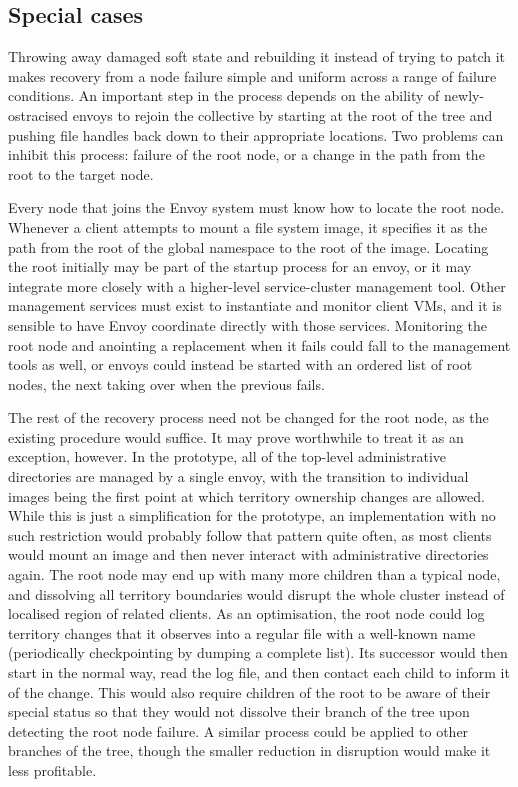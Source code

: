 \subsection{Special cases}

Throwing away damaged soft state and rebuilding it instead of trying to patch it makes recovery from a node failure simple and uniform across a range of failure conditions. An important step in the process depends on the ability of newly-ostracised envoys to rejoin the collective by starting at the root of the tree and pushing file handles back down to their appropriate locations. Two problems can inhibit this process: failure of the root node, or a change in the path from the root to the target node.

Every node that joins the Envoy system must know how to locate the root node. Whenever a client attempts to mount a file system image, it specifies it as the path from the root of the global namespace to the root of the image. Locating the root initially may be part of the startup process for an envoy, or it may integrate more closely with a higher-level service-cluster management tool. Other management services must exist to instantiate and monitor client VMs, and it is sensible to have Envoy coordinate directly with those services. Monitoring the root node and anointing a replacement when it fails could fall to the management tools as well, or envoys could instead be started with an ordered list of root nodes, the next taking over when the previous fails.

The rest of the recovery process need not be changed for the root node, as the existing procedure would suffice. It may prove worthwhile to treat it as an exception, however. In the prototype, all of the top-level administrative directories are managed by a single envoy, with the transition to individual images being the first point at which territory ownership changes are allowed. While this is just a simplification for the prototype, an implementation with no such restriction would probably follow that pattern quite often, as most clients would mount an image and then never interact with administrative directories again. The root node may end up with many more children than a typical node, and dissolving all territory boundaries would disrupt the whole cluster instead of localised region of related clients. As an optimisation, the root node could log territory changes that it observes into a regular file with a well-known name (periodically checkpointing by dumping a complete list). Its successor would then start in the normal way, read the log file, and then contact each child to inform it of the change. This would also require children of the root to be aware of their special status so that they would not dissolve their branch of the tree upon detecting the root node failure. A similar process could be applied to other branches of the tree, though the smaller reduction in disruption would make it less profitable.

